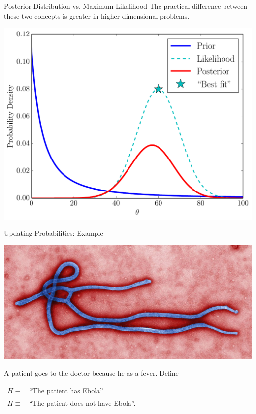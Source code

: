 \begin{frame}[t]{Posterior Distribution vs. Maximum Likelihood}
The practical difference between these two concepts is greater in higher
dimensional problems.
\begin{center}
\includegraphics[scale=0.35]{bayes.pdf}
\end{center}
\end{frame}




\begin{frame}[t]{Updating Probabilities: Example}
\begin{center}
\includegraphics[scale=0.5]{ebola.jpg}
\end{center}
A patient goes to the doctor because he as a fever. Define
\begin{center}
\begin{tabular}{ll}
$H \equiv $ & ``The patient has Ebola''\\
$\bar{H} \equiv $ & ``The patient does not have Ebola''.
\end{tabular}
\end{center}

\end{frame}

